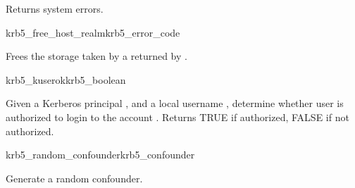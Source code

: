 Returns system errors.

\begin{funcdecl}{krb5_free_host_realm}{krb5_error_code}{\funcin}
\end{funcdecl}

Frees the storage taken by a  returned by
.

\begin{funcdecl}{krb5_kuserok}{krb5_boolean}{\funcin}
\end{funcdecl}

Given a Kerberos principal , and a local username
,
determine whether user is authorized to login to the account .
Returns TRUE if authorized, FALSE if not authorized.

\begin{funcdecl}{krb5_random_confounder}{krb5_confounder}{\funcvoid}
\end{funcdecl}

Generate a random confounder.
